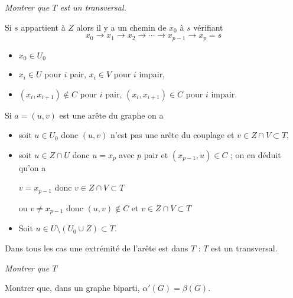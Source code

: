 \begin{Exercise}[title=Lemme]\it
Montrer que $T$ est un transversal.
\end{Exercise}
\begin{Answer}
Si $s$ appartient à $Z$ alors il y a un chemin de $x_0$ à $s$ vérifiant
\[x_0 \rightarrow x_1 \rightarrow x_2\rightarrow \cdots \rightarrow x_{p-1} \rightarrow x_p=s\]
\begin{itemize}
    \item $x_0\in U_0$ 
    \item $x_i\in U$ pour $i$ pair, $x_i\in V$ pour $i$ impair, 
    \item $(x_i, x_{i+1})\notin C$ pour $i$ pair, $(x_i, x_{i+1})\in C$ pour $i$ impair. 
\end{itemize}

Si $a = (u, v)$ est une arête du graphe on a
\begin{itemize}
  \item soit $u\in U_0$ donc $(u, v)$ n'est pas une arête du couplage et $v\in Z\cap V \subset T$,
  \item soit $u\in Z\cap U$ donc $u = x_p$ avec $p$ pair et $(x_{p-1}, u)\in C$ ; on en déduit qu'on a
  
  $v = x_{p-1}$ donc $v\in Z\cap V\subset T$
  
  ou $v\ne x_{p-1}$ donc $(u, v)\notin C$ et $v\in Z\cap V \subset T$
  \item Soit $u\in U\setminus(U_0\cup Z)\subset T$.
\end{itemize}

Dans tous les cas une extrémité de l'arête est dans $T$ : $T$ est un transversal.

\end{Answer}
\begin{Exercise}[title=Théorème de König]\it
Montrer que $T$

Montrer que, dans un graphe biparti, $\alpha'(G)=\beta(G)$.
\end{Exercise}
